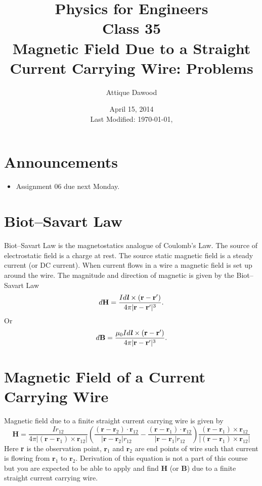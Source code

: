 \documentclass[12pt,a4paper]{article}
\title{\vspace{-3cm}Physics for Engineers\\Class 35\\Magnetic Field Due to a Straight Current Carrying Wire: Problems}
\author{Attique Dawood}
\date{April 15, 2014\\[0.2cm] Last Modified: \today, \currenttime}
\begin{document}
\maketitle
\section{Announcements}
\begin{itemize}
\item Assignment 06 due next Monday.
\end{itemize}
\section{Biot--Savart Law}
Biot--Savart Law is the magnetostatics analogue of Coulomb's Law. The source of electrostatic field is a charge at rest. The source static magnetic field is a steady current (or DC current). When current flows in a wire a magnetic field is set up around the wire. The magnitude and direction of magnetic is given by the Biot--Savart Law
\begin{equation}
d\textbf{H}=\dfrac{Id\textbf{\textit{l}}\times(\textbf{r}-\textbf{r}')}{4\pi|\textbf{r}-\textbf{r}'|^{3}}.
\end{equation}
Or
\begin{equation}
d\textbf{B}=\dfrac{\mu_0Id\textbf{\textit{l}}\times(\textbf{r}-\textbf{r}')}{4\pi|\textbf{r}-\textbf{r}'|^{3}}.
\end{equation}
\section{Magnetic Field of a Current Carrying Wire}
Magnetic field due to a finite straight current carrying wire is given by
\begin{equation}
\textbf{H}=\dfrac{Ir_{12}}{4\pi|(\textbf{r}-\textbf{r}_1)\times\textbf{r}_{12}|}\left(\dfrac{(\textbf{r}-\textbf{r}_2)\cdot\textbf{r}_{12}}{|\textbf{r}-\textbf{r}_2|r_{12}}-\dfrac{(\textbf{r}-\textbf{r}_1)\cdot\textbf{r}_{12}}{|\textbf{r}-\textbf{r}_1|r_{12}}\right)\dfrac{(\textbf{r}-\textbf{r}_1)\times\textbf{r}_{12}}{|(\textbf{r}-\textbf{r}_1)\times \textbf{r}_{12}|}
\end{equation}
Here \textbf{r} is the observation point, $\textbf{r}_1$ and $\textbf{r}_2$ are end points of wire such that current is flowing from $\textbf{r}_1$ to $\textbf{r}_2$. Derivation of this equation is not a part of this course but you are expected to be able to apply and find \textbf{H} (or \textbf{B}) due to a finite straight current carrying wire.
\newpage
\end{document}
